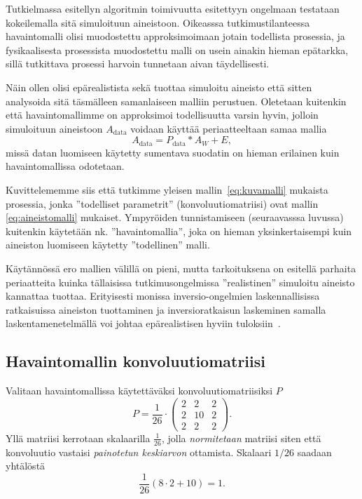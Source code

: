 Tutkielmassa esitellyn algoritmin toimivuutta esitettyyn ongelmaan testataan kokeilemalla sitä simuloituun aineistoon.
Oikeasssa tutkimustilanteessa havaintomalli olisi muodostettu approksimoimaan jotain todellista prosessia,
ja fysikaalisesta prosessista muodostettu malli on usein ainakin hieman epätarkka, sillä tutkittava prosessi harvoin tunnetaan aivan täydellisesti.

Näin ollen olisi epärealistista sekä tuottaa simuloitu aineisto että sitten analysoida sitä täsmälleen samanlaiseen malliin perustuen.
Oletetaan kuitenkin että havaintomallimme on approksimoi todellisuutta varsin hyvin,
jolloin simuloituun aineistoon $A_{\text{data}}$ voidaan käyttää periaatteeltaan samaa mallia
\begin{equation}
    \label{eq:aineistomalli}
    A_{\text{data}} = P_{\text{data}} \ast A_W + E,
\end{equation}
missä datan luomiseen käytetty sumentava suodatin on hieman erilainen kuin havaintomallissa odotetaan.

Kuvittelememme siis että tutkimme yleisen mallin~\ref{eq:kuvamalli} mukaista prosessia,
jonka ''todelliset parametrit'' (konvoluutiomatriisi) ovat mallin \ref{eq:aineistomalli} mukaiset.
Ympyröiden tunnistamiseen (seuraavasssa luvussa) kuitenkin käytetään nk. ''havaintomallia'',
joka on hieman yksinkertaisempi kuin aineiston luomiseen käytetty ''todellinen'' malli.

Käytännössä ero mallien välillä on pieni, mutta tarkoituksena on esitellä parhaita periaatteita kuinka tällaisissa tutkimusongelmissa ''realistinen'' simuloitu aineisto kannattaa tuottaa.
Erityisesti monissa inversio-ongelmien laskennallisissa ratkaisuissa aineiston tuottaminen ja inversioratkaisun laskeminen samalla laskentamenetelmällä voi johtaa epärealistisen hyviin tuloksiin~\cite{muellersiltanen12}.

\subsection{Havaintomallin konvoluutiomatriisi}
\label{sub:mallin_konvoluutiomatriisi}

Valitaan havaintomallissa käytettäväksi konvoluutiomatriisiksi $P$
\begin{equation}
    P = \frac{1}{26} \cdot
    \begin{pmatrix}
        2 & 2 & 2 \\
        2 & 10 & 2 \\
        2 & 2 & 2
    \end{pmatrix}.
\end{equation}
Yllä matriisi kerrotaan skalaarilla $\frac{1}{26}$, jolla \emph{normitetaan} matriisi siten että konvoluutio vastaisi \emph{painotetun keskiarvon} ottamista.
Skalaari $1/26$ saadaan yhtälöstä \[\frac{1}{26}(8\cdot2 + 10) = 1.\]

